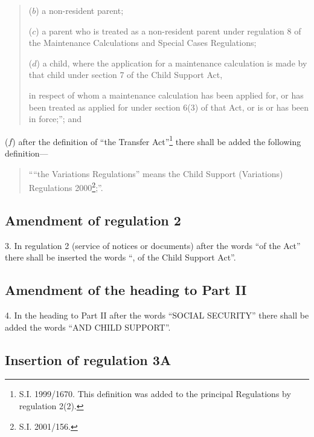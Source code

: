 \documentclass[12pt,a4paper]{article}
\begin{document}
\begin{enumerate}
\begin{quotation}
\begin{enumerate}
    ($b$) 
    a non-resident parent;

    ($c$) 
    a parent who is treated as a non-resident parent under regulation 8 of the Maintenance Calculations and Special Cases Regulations;

    ($d$) 
    a child, where the application for a maintenance calculation is made by that child under section 7 of the Child Support Act,
\end{enumerate}
    in respect of whom a maintenance calculation has been applied for, or has been treated as applied for under section 6(3) of that Act, or is or has been in force;”; and 
\end{quotation}

($f$) after the definition of “the Transfer Act”\footnote{\frenchspacing S.I. 1999/1670. This definition was added to the principal Regulations by regulation 2(2).} there shall be added the following definition—
\begin{quotation}
““the Variations Regulations” means the Child Support (Variations) Regulations 2000\footnote{\frenchspacing S.I. 2001/156.};”.
\end{quotation}
\end{enumerate}

\subsection[3. Amendment of regulation 2]{Amendment of regulation 2}

3.  In regulation 2 (service of notices or documents) after the words “of the Act” there shall be inserted the words “, of the Child Support Act”.

\subsection[4. Amendment of the heading to Part II]{Amendment of the heading to Part II}

4.  In the heading to Part II after the words “SOCIAL SECURITY” there shall be added the words “AND CHILD SUPPORT”.

\subsection[5. Insertion of regulation 3A]{Insertion of regulation 3A}
\end{document}

